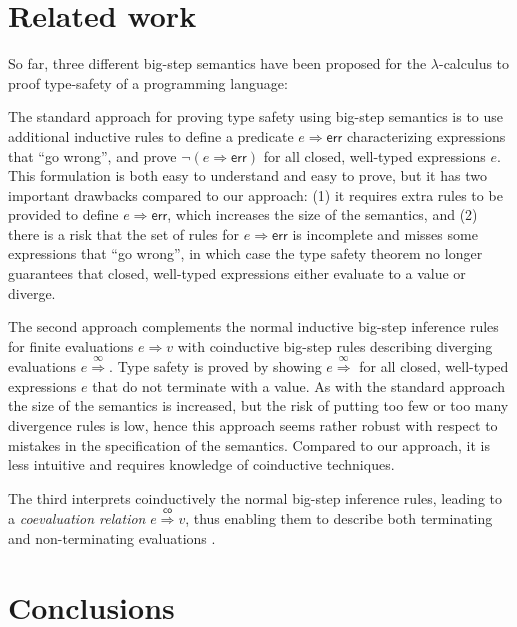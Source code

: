 \documentclass[12pt,a2paper,draft]{article}
\begin{document}
\section{Related work}

So far, three different big-step semantics have been proposed for the $\lambda$-calculus to proof
type-safety of a programming language:

The standard approach \cite{Tofte87} for proving type safety using big-step semantics is to use
additional inductive rules to define a predicate $e \Rightarrow \textsf{err}$ characterizing expressions that
``go wrong'', and prove $\neg(e \Rightarrow \textsf{err})$ for all closed,
well-typed expressions $e$. This formulation is both easy to understand and easy to prove, but
it has two important drawbacks compared to our approach:
(1) it requires extra rules to be provided to define $e \Rightarrow \textsf{err}$,
which increases the size of the semantics, and (2) there is a risk that the set of rules for
$e \Rightarrow \textsf{err}$ is incomplete and misses some expressions that ``go wrong'',
in which case the type safety theorem no longer guarantees that closed, well-typed expressions
either evaluate to a value or diverge.

The second approach \cite{CousotCousot07,LeroyGrall09} complements the normal inductive big-step
inference rules for finite evaluations $e \Rightarrow v$ with coinductive big-step rules describing
diverging evaluations $e \stackrel{\infty}{\Rightarrow}$. Type safety is proved by showing
$e \stackrel{\infty}{\Rightarrow}$ for all closed, well-typed expressions $e$ that do not terminate
with a value. As with the standard approach the size of the semantics is increased, but the risk of
putting too few or too many divergence rules is low, hence this approach seems rather robust with
respect to mistakes in the specification of the semantics. Compared to our approach, it is less
intuitive and requires knowledge of coinductive techniques.

The third interprets coinductively the normal big-step inference rules, leading to a \emph{coevaluation
relation} $e \stackrel{\mathsf{co}}{\Rightarrow} v$, thus enabling them to describe both terminating
and non-terminating evaluations \cite{LeroyGrall09}.


\section{Conclusions}




\end{document}
